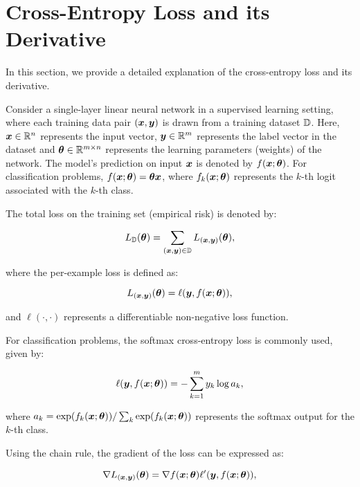 \documentclass{article}
\begin{document}
\section{Cross-Entropy Loss and its Derivative}\label{app:minibatch}

In this section, we provide a detailed explanation of the cross-entropy loss and its derivative.

Consider a single-layer linear neural network in a supervised learning setting, where each training data pair $({\bm{x}}, {\bm{y}})$ is drawn from a training dataset ${\mathbb{D}}$. Here, ${\bm{x}} \in \mathbb{R}^n$ represents the input vector, ${\bm{y}} \in \mathbb{R}^m$ represents the label vector in the dataset and ${\bm{\theta}} \in \mathbb{R}^{m\times n}$ represents the learning parameters (weights) of the network. The model's prediction on input ${\bm{x}}$ is denoted by $f({\bm{x}}; {\bm{\theta}})$. For classification problems, $f({\bm{x}}; {\bm{\theta}})={\bm{\theta}} {\bm{x}}$, where $f_k({\bm{x}};{\bm{\theta}})$ represents the $k$-th logit associated with the $k$-th class.

The total loss on the training set (empirical risk) is denoted by:

\begin{equation}
L_{{\mathbb{D}}}({\bm{\theta}})=\sum_{({\bm{x}},{\bm{y}})\in {\mathbb{D}}} L_{({\bm{x}},{\bm{y}})}({\bm{\theta}}),
\end{equation}

where the per-example loss is defined as:

\begin{equation}
L_{({\bm{x}},{\bm{y}})}({\bm{\theta}}) = \ell({\bm{y}}, f({\bm{x}}; {\bm{\theta}})),
\end{equation}

and $\ell(\cdot,\cdot)$ represents a differentiable non-negative loss function.

For classification problems, the softmax cross-entropy loss is commonly used, given by:

\begin{equation}
\ell({\bm{y}}, f({\bm{x}};{\bm{\theta}})) = - \sum_{k=1}^m y_k \log a_k,
\end{equation}

where $a_k = \exp (f_k({\bm{x}};{\bm{\theta}}))/\sum_k \exp (f_k({\bm{x}};{\bm{\theta}}))$ represents the softmax output for the $k$-th class.

Using the chain rule, the gradient of the loss can be expressed as:

\begin{equation}
\nabla L_{({\bm{x}},{\bm{y}})}({\bm{\theta}}) = \nabla f({\bm{x}};{\bm{\theta}}) \ell'({\bm{y}},f({\bm{x}};{\bm{\theta}})),\label{eq:dwhole}
\end{equation}
\end{document}

